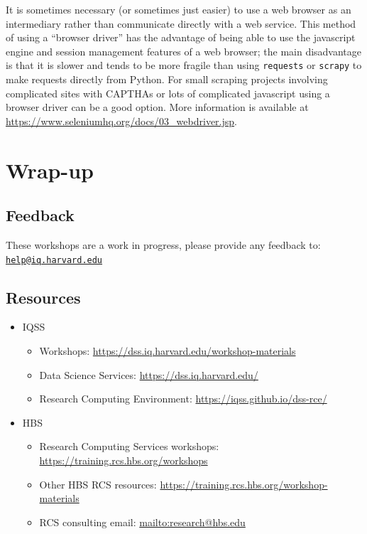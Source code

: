 \documentclass[]{book}
\providecommand{\tightlist}{%
  \setlength{\itemsep}{0pt}\setlength{\parskip}{0pt}}
\begin{document}
It is sometimes necessary (or sometimes just easier) to use a web browser as an intermediary rather than communicate directly with a web service. This method of using a ``browser driver'' has the advantage of being able to use the javascript engine and session management features of a web browser; the main disadvantage is that it is slower and tends to be more fragile than using \texttt{requests} or \texttt{scrapy} to make requests directly from Python. For small scraping projects involving complicated sites with CAPTHAs or lots of complicated javascript using a browser driver can be a good option. More information is available at \url{https://www.seleniumhq.org/docs/03_webdriver.jsp}.

\hypertarget{wrap-up-6}{%
\section{Wrap-up}\label{wrap-up-6}}

\hypertarget{feedback-6}{%
\subsection{Feedback}\label{feedback-6}}

These workshops are a work in progress, please provide any feedback to: \href{mailto:help@iq.harvard.edu}{\nolinkurl{help@iq.harvard.edu}}

\hypertarget{resources-8}{%
\subsection{Resources}\label{resources-8}}

\begin{itemize}
\tightlist
\item
  IQSS

  \begin{itemize}
  \tightlist
  \item
    Workshops: \url{https://dss.iq.harvard.edu/workshop-materials}
  \item
    Data Science Services: \url{https://dss.iq.harvard.edu/}
  \item
    Research Computing Environment: \url{https://iqss.github.io/dss-rce/}
  \end{itemize}
\item
  HBS

  \begin{itemize}
  \tightlist
  \item
    Research Computing Services workshops: \url{https://training.rcs.hbs.org/workshops}
  \item
    Other HBS RCS resources: \url{https://training.rcs.hbs.org/workshop-materials}
  \item
    RCS consulting email: \url{mailto:research@hbs.edu}
  \end{itemize}
\end{itemize}
\end{document}
